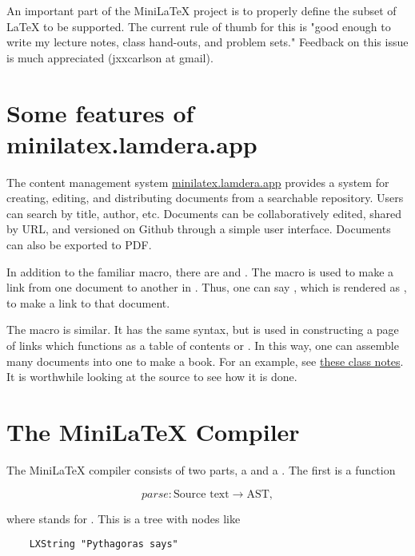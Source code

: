  An important part of the MiniLaTeX project is to properly define the subset of LaTeX to be supported.  The current rule of thumb for this is "good enough to write my lecture notes, class hand-outs, and problem sets."  Feedback on this issue is much appreciated (jxxcarlson at gmail).


\section{Some features of minilatex.lamdera.app}

The content management system \href{https://minilatex.lamdera.app}{minilatex.lamdera.app} provides a system for creating, editing, and distributing documents from a searchable repository.  Users can search by title, author, etc.  Documents can be collaboratively edited, shared by URL, and versioned on Github through a simple user interface.  Documents can also be exported to PDF.


In addition to the familiar  macro, there are   and .  The  macro 
is used to make a link from one document to another in .   Thus, one can say 
, which is rendered as , to make a link to that document.

The  macro is similar.  It has the same syntax, but is used in constructing a page of links which functions as a table of contents or . In this way, one can assemble many documents into one to make a book.  For an example, see \href{https://minilatex.lamdera.app/g/34}{these class notes}. It is worthwhile looking at the source to see how it is done.





\section{The MiniLaTeX Compiler}

The MiniLaTeX compiler consists of two parts, a  and a .  The first is a function

$$
parse: \text{Source text} \to \text{AST},
$$

where  stands for .  This is a tree with nodes like 

\begin{verbatim}
    LXString "Pythagoras says"
\end{verbatim} 

